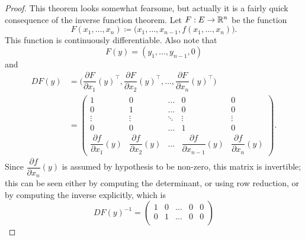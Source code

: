 \begin{proof}
  This theorem looks somewhat fearsome, but actually it is a fairly quick consequence of the inverse function theorem.
  Let \(F : E \to \mathbb{R}^n\) be the function
  \[
    F(x_1, \dots, x_n) \coloneqq \big(x_1, \dots, x_{n - 1}, f(x_1, \dots, x_n)\big).
  \]
  This function is continuously differentiable.
  Also note that
  \[
    F(y) = (y_1, \dots, y_{n - 1}, 0)
  \]
  and
  \begin{align*}
    D F(y) & = \bigg(\dfrac{\partial F}{\partial x_1}(y)^\top, \dfrac{\partial F}{\partial x_2}(y)^\top, \dots, \dfrac{\partial F}{\partial x_n}(y)^\top\bigg)                                             \\
           & = \begin{pmatrix}
                 1                                   & 0                                   & \dots  & 0                                         & 0                                   \\
                 0                                   & 1                                   & \dots  & 0                                         & 0                                   \\
                 \vdots                              & \vdots                              & \ddots & \vdots                                    & \vdots                              \\
                 0                                   & 0                                   & \dots  & 1                                         & 0                                   \\
                 \dfrac{\partial f}{\partial x_1}(y) & \dfrac{\partial f}{\partial x_2}(y) & \dots  & \dfrac{\partial f}{\partial x_{n - 1}}(y) & \dfrac{\partial f}{\partial x_n}(y)
               \end{pmatrix}.
  \end{align*}
  Since \(\dfrac{\partial f}{\partial x_n}(y)\) is assumed by hypothesis to be non-zero, this matrix is invertible;
  this can be seen either by computing the determinant, or using row reduction, or by computing the inverse explicitly, which is
  \[
    D F(y)^{-1} = \begin{pmatrix}
      1                                        & 0                                        & \dots  & 0                                              & 0      \\
      0                                        & 1                                        & \dots  & 0                                              & 0      \\

\end{pmatrix}\]
\end{proof}
